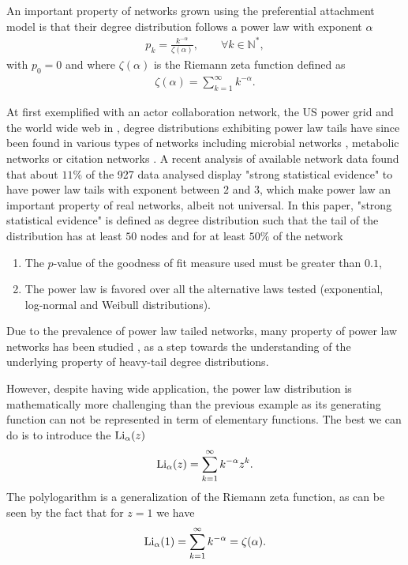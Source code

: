 \documentclass[
11pt, %
american, %
singlespacing, %
final, %
nolistspacing, %
liststotoc, %
headsepline, %
]{MastersDoctoralThesis} %
\begin{document}
An important property of networks grown using the preferential attachment model is that their degree distribution follows a power law with exponent $\alpha$
\begin{align}
	p_k = \frac{k^{-\alpha}}{\zeta(\alpha)}, \qquad \forall k \in \mathbb{N}^*, \label{Power law degree distribution}
\end{align}
with $p_0 = 0$ and where $\zeta(\alpha)$ is the Riemann zeta function defined as
\begin{align}
	\zeta(\alpha) = \sum_{k=1}^\infty k^{-\alpha}. \label{Definition Riemann zeta function}
\end{align}

At first exemplified with an actor collaboration network, the US power grid and the world wide web in \cite{barabasi1999emergence}, degree distributions exhibiting power law tails have since been found in various types of networks including microbial networks \cite{agler2016microbial}, metabolic networks \cite{jeong2000large} or citation networks \cite{newman2001structure, jeong2003measuring}. A recent analysis of available network data \cite{broido2018scale} found that about $11\%$ of the 927 data analysed display "strong statistical evidence" to have power law tails with exponent between $2$ and $3$, which make power law an important property of real networks, albeit not universal. In this paper, "strong statistical evidence" is defined as degree distribution such that the tail of the distribution has at least $50$ nodes and for at least $50\%$ of the network
\begin{enumerate}
	\item The $p$-value of the goodness of fit measure used must be greater than $0.1$,
	\item The power law is favored over all the alternative laws tested (exponential, log-normal and Weibull distributions).
\end{enumerate}
Due to the prevalence of power law tailed networks, many property of power law networks has been studied \cite{aiello2000random, albert2000error, goh2001universal, ichinose2017invasion, pastorsatorras2015epidemic, stumpf2005subnets}, as a step towards the understanding of the underlying property of heavy-tail degree distributions.

However, despite having wide application, the power law distribution is mathematically more challenging than the previous example as its generating function can not be represented in term of elementary functions. The best we can do is to introduce the  $\mathrm{Li}_{\alpha}\!\left(z\right)$
\begin{align}
	\mathrm{Li}_{\alpha}\!\left(z\right) = \sum_{k=1}^\infty k^{-\alpha} z^k. \label{Definition of polylogarithm}
\end{align}
The polylogarithm is a generalization of the Riemann zeta function, as can be seen by the fact that for $z = 1$ we have
\begin{align}
	\mathrm{Li}_{\alpha}\!\left(1\right) = \sum_{k=1}^\infty k^{-\alpha} = \zeta(\alpha) \label{Polylogarithm of 1}.
\end{align}
\end{document}
